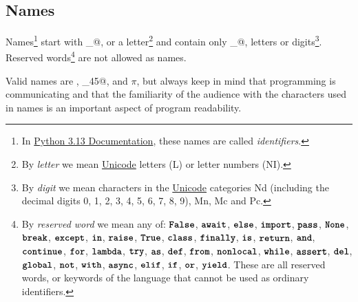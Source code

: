 \subsection*{Names}

Names\footnote{
In
\href{https://docs.python.org/3/reference/lexical_analysis.html}{
\color{DarkBlue} Python 3.13 Documentation},
these names are called \emph{identifiers}.
} start with \verb@_@, or a
letter\footnote{
By \emph{letter}
we mean \href{http://unicode.org/reports/tr44/}{\color{DarkBlue}Unicode} letters (L) or letter numbers (NI).
} and contain only \verb@_@, 
letters or digits\footnote{
By \emph{digit} we mean characters in the
\href{http://unicode.org/reports/tr44/}{Unicode} categories
Nd (including the decimal digits 0, 1, 2, 3, 4, 5, 6, 7, 8, 9), Mn, Mc  and Pc. 
}. Reserved words\footnote{
By \emph{reserved word} we mean any of:
$\textbf{\texttt{False}}$, $\textbf{\texttt{await}}$, $\textbf{\texttt{else}}$, $\textbf{\texttt{import}}$, $\textbf{\texttt{pass}}$, $\textbf{\texttt{None}}$, $\textbf{\texttt{break}}$, $\textbf{\texttt{except}}$, $\textbf{\texttt{in}}$, $\textbf{\texttt{raise}}$, $\textbf{\texttt{True}}$, $\textbf{\texttt{class}}$, $\textbf{\texttt{finally}}$, $\textbf{\texttt{is}}$, $\textbf{\texttt{return}}$, $\textbf{\texttt{and}}$, $\textbf{\texttt{continue}}$, $\textbf{\texttt{for}}$, $\textbf{\texttt{lambda}}$, $\textbf{\texttt{try}}$, $\textbf{\texttt{as}}$, $\textbf{\texttt{def}}$, $\textbf{\texttt{from}}$, $\textbf{\texttt{nonlocal}}$, $\textbf{\texttt{while}}$, $\textbf{\texttt{assert}}$, $\textbf{\texttt{del}}$, $\textbf{\texttt{global}}$, $\textbf{\texttt{not}}$, $\textbf{\texttt{with}}$, $\textbf{\texttt{async}}$, $\textbf{\texttt{elif}}$, $\textbf{\texttt{if}}$, $\textbf{\texttt{or}}$, $\textbf{\texttt{yield}}$.
These are all reserved words, or keywords of the language that cannot be used as ordinary identifiers.
} are not allowed as names.

Valid names are \verb@x@, \verb@_45@, and $\mathtt{\pi}$,
but always keep in mind that programming is communicating and that the familiarity of the
audience with the characters used in names is an important aspect of program readability.
